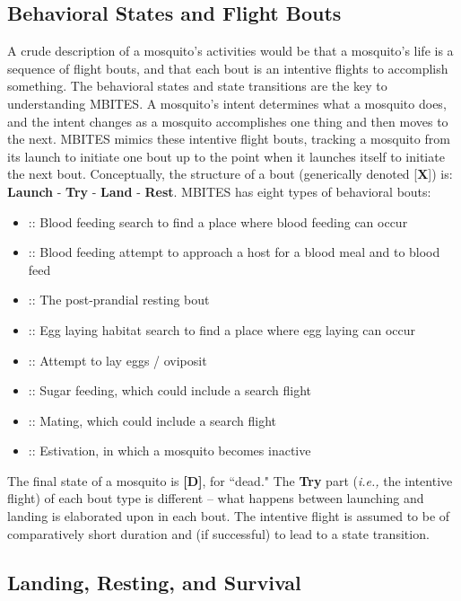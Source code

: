 \documentclass{article}
\newcommand{\ie}{{\em i.e., }}
\newcommand{\Bbout}{{\bf [B]}}
\newcommand{\Fbout}{{\bf [F]}}
\newcommand{\Rbout}{{\bf [R]}}
\newcommand{\Lbout}{{\bf [L]}}
\newcommand{\Obout}{{\bf [O]}}
\newcommand{\Sbout}{{\bf [S]}}
\newcommand{\Mbout}{{\bf [M]}}
\newcommand{\Ebout}{{\bf [E]}}
\newcommand{\Dead}{{\bf [D]}}
\begin{document}
\subsection{Behavioral States and Flight Bouts}

A crude description of a mosquito's activities would be that a mosquito's life is a sequence of flight bouts, and that each bout is an intentive flights to accomplish something. The behavioral states and state transitions are the key to understanding MBITES. A mosquito's intent determines what a mosquito does, and the intent changes as a mosquito accomplishes one thing and then moves to the next. MBITES mimics these intentive flight bouts, tracking a  mosquito from its launch to initiate one bout up to the point when it launches itself to initiate the next bout. Conceptually, the structure of a bout (generically denoted [{\bf X}]) is:  {\bf Launch} - {\bf Try} - {\bf Land} - {\bf Rest}. MBITES has  eight types of behavioral bouts: 
\begin{itemize}
\item[\Fbout] :: Blood feeding search  to find a place where blood feeding can occur
\item[\Bbout] :: Blood feeding attempt to approach a host for a blood meal and to blood feed
\item[\Rbout] :: The post-prandial resting bout
\item[\Lbout] :: Egg laying habitat search to find a place where egg laying can occur
\item[\Obout] :: Attempt to lay eggs / oviposit 
\item[\Sbout] :: Sugar feeding, which could include a search flight 
\item[\Mbout] :: Mating, which could include a search flight 
\item[\Ebout] :: Estivation, in which a mosquito becomes inactive 
\end{itemize}
%
The final state of a mosquito is \Dead, for ``dead." The {\bf Try} part (\ie the intentive flight) of each bout type  is different -- what happens between launching and landing is elaborated upon in each bout. The intentive flight is assumed to be of comparatively short duration and (if successful) to lead to a state transition. 

\subsection{Landing, Resting, and Survival}
\end{document}
